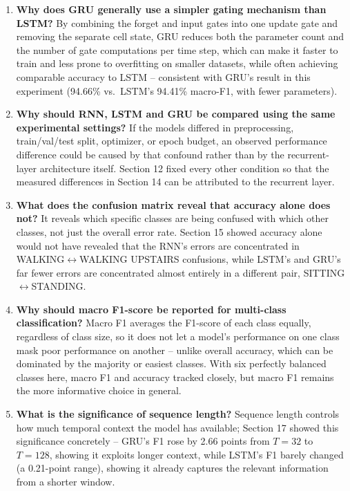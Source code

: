 \documentclass[10pt]{article}
\begin{document}
\begin{enumerate}
\item \textbf{Why does GRU generally use a simpler gating mechanism than
LSTM?}
By combining the forget and input gates into one update gate and removing
the separate cell state, GRU reduces both the parameter count and the
number of gate computations per time step, which can make it faster to
train and less prone to overfitting on smaller datasets, while often
achieving comparable accuracy to LSTM -- consistent with GRU's result in
this experiment (94.66\% vs.\ LSTM's 94.41\% macro-F1, with fewer
parameters).

\item \textbf{Why should RNN, LSTM and GRU be compared using the same
experimental settings?}
If the models differed in preprocessing, train/val/test split, optimizer,
or epoch budget, an observed performance difference could be caused by
that confound rather than by the recurrent-layer architecture itself.
Section 12 fixed every other condition so that the measured differences in
Section 14 can be attributed to the recurrent layer.

\item \textbf{What does the confusion matrix reveal that accuracy alone
does not?}
It reveals which specific classes are being confused with which other
classes, not just the overall error rate. Section 15 showed accuracy alone
would not have revealed that the RNN's errors are concentrated in
WALKING$\leftrightarrow$WALKING UPSTAIRS confusions, while LSTM's and GRU's
far fewer errors are concentrated almost entirely in a different pair,
SITTING$\leftrightarrow$STANDING.

\item \textbf{Why should macro F1-score be reported for multi-class
classification?}
Macro F1 averages the F1-score of each class equally, regardless of class
size, so it does not let a model's performance on one class mask poor
performance on another -- unlike overall accuracy, which can be dominated
by the majority or easiest classes. With six perfectly balanced classes
here, macro F1 and accuracy tracked closely, but macro F1 remains the more
informative choice in general.

\item \textbf{What is the significance of sequence length?}
Sequence length controls how much temporal context the model has available;
Section 17 showed this significance concretely -- GRU's F1 rose by 2.66
points from $T=32$ to $T=128$, showing it exploits longer context, while
LSTM's F1 barely changed (a 0.21-point range), showing it already captures
the relevant information from a shorter window.


\end{enumerate}
\end{document}
